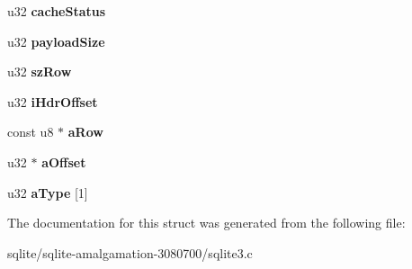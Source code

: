 \begin{DoxyCompactItemize}
\item 
\hypertarget{struct_vdbe_cursor_acf243b5a94a6e5a11341d6fece473c00}{u32 {\bfseries cache\+Status}}\label{struct_vdbe_cursor_acf243b5a94a6e5a11341d6fece473c00}

\item 
\hypertarget{struct_vdbe_cursor_a92f39b19e82152386e20ede96d177058}{u32 {\bfseries payload\+Size}}\label{struct_vdbe_cursor_a92f39b19e82152386e20ede96d177058}

\item 
\hypertarget{struct_vdbe_cursor_ac0fa6de4df7f418dfd5307cb892ba455}{u32 {\bfseries sz\+Row}}\label{struct_vdbe_cursor_ac0fa6de4df7f418dfd5307cb892ba455}

\item 
\hypertarget{struct_vdbe_cursor_a838b93338c0a8539e28697e291c83a91}{u32 {\bfseries i\+Hdr\+Offset}}\label{struct_vdbe_cursor_a838b93338c0a8539e28697e291c83a91}

\item 
\hypertarget{struct_vdbe_cursor_a6b6f7444963e83e48cd3d63edf539c94}{const u8 $\ast$ {\bfseries a\+Row}}\label{struct_vdbe_cursor_a6b6f7444963e83e48cd3d63edf539c94}

\item 
\hypertarget{struct_vdbe_cursor_a17431e67b341282aeb6c026cd01ec1e9}{u32 $\ast$ {\bfseries a\+Offset}}\label{struct_vdbe_cursor_a17431e67b341282aeb6c026cd01ec1e9}

\item 
\hypertarget{struct_vdbe_cursor_aa4a4b02d8b0276a413f1191382469141}{u32 {\bfseries a\+Type} \mbox{[}1\mbox{]}}\label{struct_vdbe_cursor_aa4a4b02d8b0276a413f1191382469141}

\end{DoxyCompactItemize}


The documentation for this struct was generated from the following file\+:\begin{DoxyCompactItemize}
\item 
sqlite/sqlite-\/amalgamation-\/3080700/sqlite3.\+c\end{DoxyCompactItemize}
